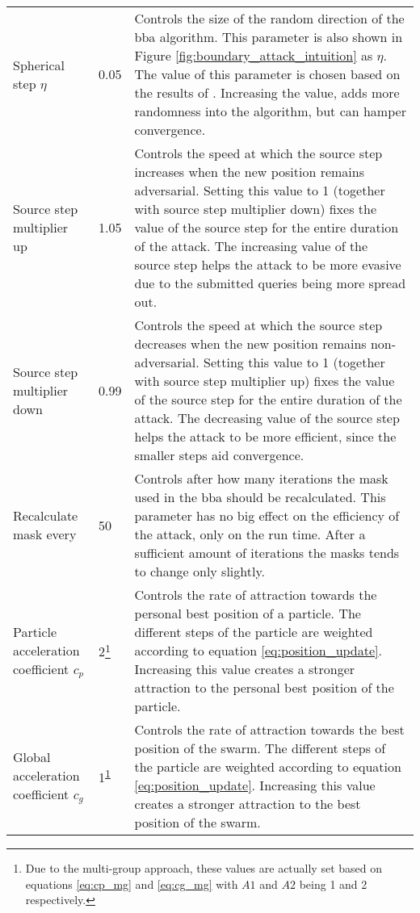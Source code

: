 \begin{longtable}{p{3cm}p{2.5cm}p{7cm}}
Spherical step $\eta$	&0.05 & Controls the size of the random direction of the \gls{bba} algorithm. This parameter is also shown in Figure \ref{fig:boundary_attack_intuition} as $\eta$. The value of this parameter is chosen based on the results of \cite{brunner_guessing_2019}. Increasing the value, adds more randomness into the algorithm, but can hamper convergence.\\
Source step multiplier up &1.05	&Controls the speed at which the source step increases when the new position remains adversarial. Setting this value to 1 (together with source step multiplier down) fixes the value of the source step for the entire duration of the attack. The increasing value of the source step helps the attack to be more evasive due to the submitted queries being more spread out.\\
Source step multiplier down &0.99 &Controls the speed at which the source step decreases when the new position remains non-adversarial. Setting this value to 1 (together with source step multiplier up) fixes the value of the source step for the entire duration of the attack. The decreasing value of the source step helps the attack to be more efficient, since the smaller steps aid convergence.\\
Recalculate mask every &50	&Controls after how many iterations the mask used in the \gls{bba} should be recalculated. This parameter has no big effect on the efficiency of the attack, only on the run time. After a sufficient amount of iterations the masks tends to change only slightly.\\
Particle acceleration coefficient $c_p$ &2\footnote{\label{ftn:cp} Due to the multi-group approach, these values are actually set based on equations \ref{eq:cp_mg} and \ref{eq:cg_mg} with $A1$ and $A2$ being 1 and 2 respectively.} &Controls the rate of attraction towards the personal best position of a particle. The different steps of the particle are weighted according to equation \ref{eq:position_update}. Increasing this value creates a stronger attraction to the personal best position of the particle.\\
Global acceleration coefficient $c_g$ &1\textsuperscript{\ref{ftn:cp}} &Controls the rate of attraction towards the best position of the swarm. The different steps of the particle are weighted according to equation \ref{eq:position_update}. Increasing this value creates a stronger attraction to the best position of the swarm.\\
\end{longtable}